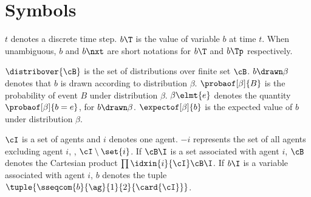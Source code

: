 \section*{Symbols}

\(t\) denotes a discrete time step.
\(b\T\) is the value of variable \(b\) at time \(t\).
When unambiguous, \(b\) and \(b\nxt\) are short notations for \(b\T\) and \(b\Tp\) respectively.

\(\distribover{\cB}\) is the set of distributions over finite set \(\cB\).
\(b \drawn \beta\) denotes that \(b\) is drawn according to distribution \(\beta\).
\(\probaof[\beta]{B}\) is the probability of event \(B\) under distribution \(\beta\).
\(\beta \elmt {e}\) denotes the quantity \(\probaof[\beta]{b = e}\), for \(b \drawn \beta\).
\(\expectof[\beta]{b}\) is the expected value of \(b\) under distribution \(\beta\).

\(\cI\) is a set of agents and \(i\) denotes one agent.
\(-i\) represents the set of all agents excluding agent \(i\), \ie, \(\cI \setminus \set{i}\).
If \(\cB\I\) is a set associated with agent \(i\), \(\cB\) denotes the Cartesian product \(\prod\idxin{i}{\cI} \cB\I\).
If \(b\I\) is a variable associated with agent \(i\), \(b\) denotes the tuple \(\tuple{\sseqcom{b}{\ag}{1}{2}{\card{\cI}}}\).

\printglossary[type=acronym,title=Acronyms\bigskip]
